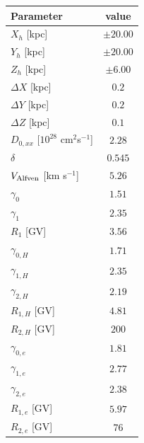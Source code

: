 \documentclass[doublespace,nopageskip]{VTthesis} %
\begin{document}
\begin{table}
\centering
\begin{tabular}{lc}\hline\hline
Parameter                                              & value\\\hline
$X_h$ [kpc]                                            & $\pm 20.00$\\
$Y_h$ [kpc]                                            & $\pm 20.00$\\
$Z_h$ [kpc]                                            & $\pm 6.00$\\
$\Delta X$ [kpc]                                       & $0.2$\\
$\Delta Y$ [kpc]                                       & $0.2$\\
$\Delta Z$ [kpc]                                       & $0.1$\\
$D_{0,xx}$ [$10^{28}$ cm$^2$s$^{-1}$]                  & $2.28$\\
$\delta$                              & $0.545$\\
$V_{\rm Alfven}$ [km s$^{-1}$]                         & $5.26$ \\
$\gamma_0$                            & $1.51$ \\
$\gamma_1$                            & $2.35$\\
$R_1$ [GV]                            & $3.56$\\
$\gamma_{0,H}$                        & $1.71$\\
$\gamma_{1,H}$                        & $2.35$\\
$\gamma_{2,H}$                        & $2.19$\\
$R_{1,H}$ [GV]                        & $4.81$\\
$R_{2,H}$ [GV]                        & $200$\\
$\gamma_{0,e}$                        & $1.81$\\
$\gamma_{1,e}$                        & $2.77$\\
$\gamma_{2,e}$                        & $2.38$\\
$R_{1,e}$ [GV]                        & $5.97$\\
$R_{2,e}$ [GV]                        & $76$\\\hline\hline

\end{tabular}
\end{table}
\end{document}
